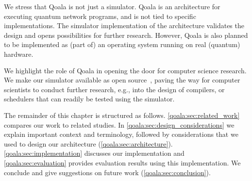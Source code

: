 We stress that Qoala is not just a simulator.
Qoala is an architecture for executing quantum network programs, and is not tied to specific implementations.
The simulator implementation of the architecture validates the design and opens possibilities for further research.
However, Qoala is also planned to be implemented as (part of) an operating system running on real (quantum) hardware.

We highlight the role of Qoala in opening the door for computer science research. We make our simulator available as open source~\cite{qoala2023simulator}, paving the way for computer scientists to conduct further research, e.g., into the design of compilers, or schedulers that can readily be tested using the simulator. 

The remainder of this chapter is structured as follows. \cref{qoala:sec:related_work} compares our work to related studies. In \cref{qoala:sec:design_considerations} we explain important context and terminology, followed by considerations that we used to design our architecture (\cref{qoala:sec:architecture}). \cref{qoala:sec:implementation} discusses our implementation and \cref{qoala:sec:evaluation} provides evaluation results using this implementation. We conclude and give suggestions on future work (\cref{qoala:sec:conclusion}).

